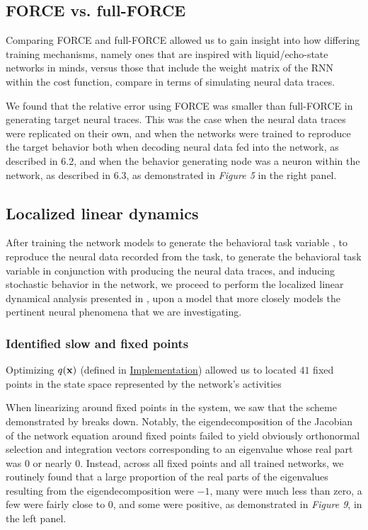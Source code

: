 \documentclass[12pt,a4paper,final]{iopart}
\begin{document}
\subsection{FORCE vs. full-FORCE}
Comparing FORCE and full-FORCE allowed us to gain insight into how differing training mechanisms, namely ones that are inspired with liquid/echo-state networks in minds, versus those that include the weight matrix of the RNN within the cost function, compare in terms of simulating neural data traces.

We found that the relative error using FORCE was smaller than full-FORCE in generating target neural traces. This was the case when the neural data traces were replicated on their own, and when the networks were trained to reproduce the target behavior both when decoding neural data fed into the network, as described in 6.2, and when the behavior generating node was a neuron within the network, as described in 6.3, as demonstrated in \emph{Figure 5} in the right panel.

\subsection{Localized linear dynamics}
After training the network models to generate the behavioral task variable \cite{CohenLol}, to reproduce the neural data recorded from the task, to generate the behavioral task variable in conjunction with producing the neural data traces, and inducing stochastic behavior in the network, we proceed to perform the localized linear dynamical analysis presented in \cite{BarakSussillo}, upon a model that more closely models the pertinent neural phenomena that we are investigating. 

\subsubsection{Identified slow and fixed points}
Optimizing $q({\bf x})$ (defined in \hyperref[sec:imp]{Implementation}) allowed us to located $41$ fixed points in the state space represented by the network's activities

When linearizing around fixed points in the system, we saw that the scheme demonstrated by \cite{Mante2013, BarakSussillo} breaks down. Notably, the eigendecomposition of the Jacobian of the network equation around fixed points failed to yield obviously orthonormal selection and integration vectors corresponding to an eigenvalue whose real part was $0$ or nearly $0$. Instead, across all fixed points and all trained networks, we routinely found that a large proportion of the real parts of the eigenvalues resulting from the eigendecomposition were $-1$, many were much less than zero, a few were fairly close to $0$, and some were positive, as demonstrated in \emph{Figure 9}, in the left panel.
\end{document}

